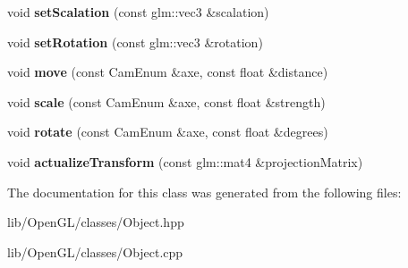 \begin{DoxyCompactItemize}
\mbox{\label{class_object_a5211444ea1b8e56ad9d6727d00c69f33}} 
void {\bfseries set\+Scalation} (const glm\+::vec3 \&scalation)
\item 
\mbox{\label{class_object_aea32ce3191fdae2dd8d89573a0bbc829}} 
void {\bfseries set\+Rotation} (const glm\+::vec3 \&rotation)
\item 
\mbox{\label{class_object_ad0f8e3212f78eede8a6bca2177154b72}} 
void {\bfseries move} (const Cam\+Enum \&axe, const float \&distance)
\item 
\mbox{\label{class_object_ad88f29fe3f7e8cf661156291c1a7f607}} 
void {\bfseries scale} (const Cam\+Enum \&axe, const float \&strength)
\item 
\mbox{\label{class_object_a14e4e02ae69334c12bfab9cb47703a02}} 
void {\bfseries rotate} (const Cam\+Enum \&axe, const float \&degrees)
\item 
\mbox{\label{class_object_a1688d829b96ed8374dbc619b47b5dfcc}} 
void {\bfseries actualize\+Transform} (const glm\+::mat4 \&projection\+Matrix)
\end{DoxyCompactItemize}


The documentation for this class was generated from the following files\+:\begin{DoxyCompactItemize}
\item 
lib/\+Open\+G\+L/classes/Object.\+hpp\item 
lib/\+Open\+G\+L/classes/Object.\+cpp\end{DoxyCompactItemize}
